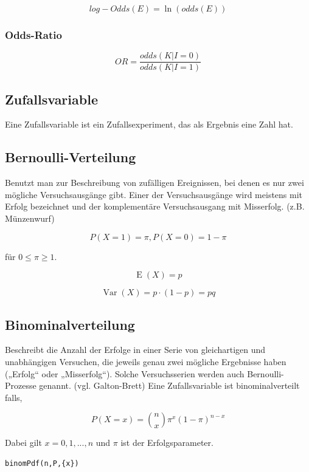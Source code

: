 \documentclass{article}
\begin{document}
\begin{multicols*}{3}
      $$log-Odds(E) = \ln (odds(E))$$

      \subsubsection{Odds-Ratio}

      $$ OR = \frac{odds(K|I = 0)}{odds(K|I=1)}$$

    \subsection{Zufallsvariable}

      Eine Zufallsvariable ist ein Zufallsexperiment, das als
      Ergebnis eine Zahl hat.

    \subsection{Bernoulli-Verteilung}

      Benutzt man zur Beschreibung von zufälligen Ereignissen,
      bei denen es nur zwei mögliche Versuchsausgänge gibt.
      Einer der Versuchsausgänge wird meistens mit Erfolg bezeichnet
      und der komplementäre Versuchsausgang mit Misserfolg. (z.B. Münzenwurf)

      $$P(X=1)=\pi, P(X=0)=1-\pi$$

      für $0 \leq \pi \geq 1$.

      $$\operatorname {E}\left(X\right)=p$$

      $${\displaystyle \operatorname {Var} (X)=p\cdot (1-p)=pq}$$
    \subsection{Binominalverteilung}

      Beschreibt die Anzahl der Erfolge in einer Serie von gleichartigen und
      unabhängigen Versuchen, die jeweils genau zwei mögliche Ergebnisse haben
      („Erfolg“ oder „Misserfolg“). Solche Versuchsserien werden auch Bernoulli-Prozesse genannt.
      (vgl. Galton-Brett)
      Eine Zufallsvariable ist binominalverteilt falls,

      $$P(X=x)= \binom{n}{x} \pi ^x (1 - \pi)^{n-x}$$

      Dabei gilt $x = 0,1,...,n$ und $\pi$ ist der Erfolgsparameter.

      \begin{Verbatim}[frame=single]
binomPdf(n,P,{x})
      \end{Verbatim}


\end{multicols*}
\end{document}
